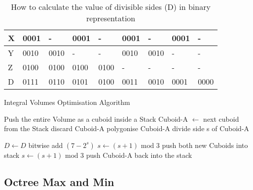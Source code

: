 \documentclass{subfiles}
\begin{document}
\begin{table}[!htbp]
	\renewcommand{\arraystretch}{1.3}
	\caption{How to calculate the value of divisible sides (D) in binary representation}
	\label{tab:Dbinary}
	\centering
	\begin{tabular}{|P{0.3cm}||P{0.5cm}|P{0.5cm}|P{0.5cm}|P{0.5cm}|P{0.5cm}|P{0.5cm}|P{0.5cm}|P{0.5cm}|}
		\hline
		X &	0001 &	-	 &	0001 &	-	 &	0001 &	-	 &	0001 &	-   \\
		\hline
		Y &	0010 &	0010 &	-	 &	-	 &	0010 &	0010 &	-	 &	-   \\
		\hline
		Z &	0100 &	0100 &	0100 &	0100 &	-	 &	-	 &	-	 &	-   \\
		\hline
		D &	0111 &	0110 &	0101 &	0100 &	0011 &	0010 &	0001 &	0000\\
		\hline
	\end{tabular}
\end{table}



\begin{algorithm}[!htbp]
	\caption{Integral Volumes Optimisation Algorithm}
	\label{alg:IVoptAdvance}
	\centering
	\begin{algorithmic}[1]
		\STATE Push the entire Volume as a cuboid inside a Stack
		\STATE Cuboid-A   $\gets$  next cuboid from the Stack 
		\STATE	discard Cuboid-A
		\STATE polygonise Cuboid-A
		\STATE	divide side s of Cuboid-A 
		
		\STATE	$D \gets D$ bitwise add $(7-2^s)$
		\ENDIF
		\STATE 	$s \gets (s+1) \text{ mod } 3$
		\STATE push both new Cuboids into stack
		\ELSE 
		\STATE $s \gets (s+1) \text{ mod } 3$
		\STATE push Cuboid-A back into the stack
		
		\ENDIF
		\ENDWHILE
	\end{algorithmic}
\end{algorithm}


\subsection{Octree Max and Min} \label{sec:OctreeMaxMin}
\end{document}
